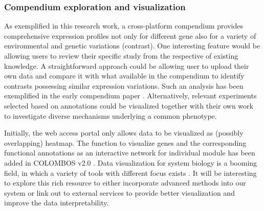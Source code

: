 




\subsubsection*{Compendium exploration and visualization}

As exemplified in this research work, a cross-platform compendium provides
comprehensive expression profiles not only for different gene also for a
variety of environmental and genetic variations (contrast).
One interesting feature would be allowing users to review their specific study
from the respective of existing knowledge.
%
A straightforward approach could be allowing user to upload their own data and
compare it with what available in the compendium to identify contrasts
possessing similar expression variations.
%
Such an analysis has been exemplified in the early compendium paper
\cite{Hughes2000}.
%
Alternatively, relevant experiments selected based on annotations could be
visualized together with their own work to investigate diverse mechanisms
underlying a common phenotype.
%




%
Initially, the web access portal only allows data to be visualized as (possibly
overlapping) heatmap.  The function to visualize genes and the corresponding
functional annotations as an interactive network for individual module has been
added in COLOMBOS v2.0 \cite{Meysman2014}.
%
Data visualization for system biology is a booming field, in which a variety of
tools with different focus exists \cite{Gehlenborg2010}.
%
It will be interesting to explore this rich resource to either incorporate
advanced methods into our system or link out to external services to provide
better visualization and improve the data interpretability.
%
%




